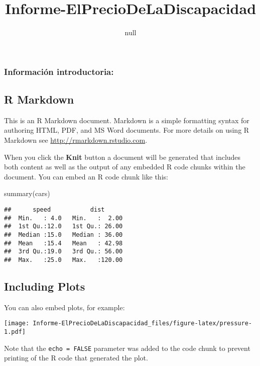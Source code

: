 \documentclass[
]{article}
\title{Informe-ElPrecioDeLaDiscapacidad}
\author{}
\date{\vspace{-2.5em}null}
\newenvironment{Shaded}{\begin{snugshade}}{\end{snugshade}}
\newcommand{\FunctionTok}[1]{\textcolor[rgb]{0.00,0.00,0.00}{#1}}
\newcommand{\NormalTok}[1]{#1}
\begin{document}
\maketitle

\hypertarget{informaciuxf3n-introductoria}{%
\subsubsection{Información
introductoria:}\label{informaciuxf3n-introductoria}}

\hypertarget{r-markdown}{%
\subsection{R Markdown}\label{r-markdown}}

This is an R Markdown document. Markdown is a simple formatting syntax
for authoring HTML, PDF, and MS Word documents. For more details on
using R Markdown see \url{http://rmarkdown.rstudio.com}.

When you click the \textbf{Knit} button a document will be generated
that includes both content as well as the output of any embedded R code
chunks within the document. You can embed an R code chunk like this:

\begin{Shaded}
\begin{Highlighting}[]
\FunctionTok{summary}\NormalTok{(cars)}
\end{Highlighting}
\end{Shaded}

\begin{verbatim}
##      speed           dist       
##  Min.   : 4.0   Min.   :  2.00  
##  1st Qu.:12.0   1st Qu.: 26.00  
##  Median :15.0   Median : 36.00  
##  Mean   :15.4   Mean   : 42.98  
##  3rd Qu.:19.0   3rd Qu.: 56.00  
##  Max.   :25.0   Max.   :120.00
\end{verbatim}

\hypertarget{including-plots}{%
\subsection{Including Plots}\label{including-plots}}

You can also embed plots, for example:

\texttt{[image: Informe-ElPrecioDeLaDiscapacidad\_files/figure-latex/pressure-1.pdf]}

Note that the \texttt{echo\ =\ FALSE} parameter was added to the code
chunk to prevent printing of the R code that generated the plot.
\end{document}
